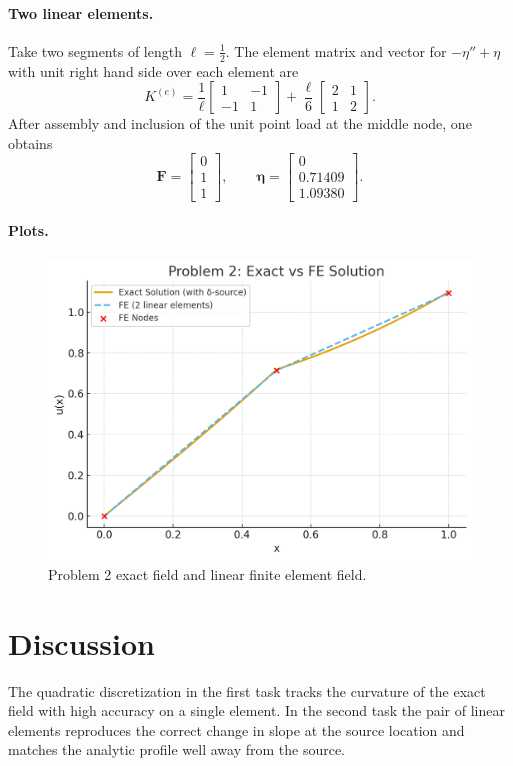 \documentclass[12pt,a4paper]{article}
\begin{document}
\paragraph{Two linear elements.}
Take two segments of length \(\ell=\tfrac12\). The element matrix and vector for \(−\eta''+\eta\) with unit right hand side over each element are
\[
K^{(e)}=\frac{1}{\ell}
\begin{bmatrix}
1&−1\\
−1&1
\end{bmatrix}
+\frac{\ell}{6}
\begin{bmatrix}
2&1\\
1&2
\end{bmatrix}.
\]
After assembly and inclusion of the unit point load at the middle node, one obtains
\[
\boldsymbol{F}=\begin{bmatrix}0\\1\\1\end{bmatrix},
\qquad
\boldsymbol{\eta}=
\begin{bmatrix}
0\\[2pt]
0.71409\\[2pt]
1.09380
\end{bmatrix}.
\]

\paragraph{Plots.}
\begin{figure}[H]
  \centering
  \includegraphics[width=0.7\linewidth]{hw3_prob2.png}
  \caption{Problem 2 exact field and linear finite element field.}
\end{figure}

\section*{Discussion}
The quadratic discretization in the first task tracks the curvature of the exact field with high accuracy on a single element. In the second task the pair of linear elements reproduces the correct change in slope at the source location and matches the analytic profile well away from the source.
\end{document}
